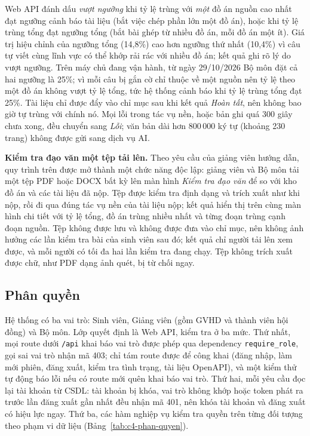 \documentclass[../main.tex]{subfiles}
\begin{document}
Web API đánh dấu \textit{vượt ngưỡng} khi tỷ lệ trùng với \textit{một} đồ án nguồn cao nhất đạt ngưỡng cảnh báo tài liệu (bắt việc chép phần lớn một đồ án), hoặc khi tỷ lệ trùng tổng đạt ngưỡng tổng (bắt bài ghép từ nhiều đồ án, mỗi đồ án một ít). Giá trị hiệu chỉnh của ngưỡng tổng (14,8\%) cao hơn ngưỡng thứ nhất (10,4\%) vì câu tự viết cùng lĩnh vực có thể khớp rải rác với nhiều đồ án; kết quả ghi rõ lý do vượt ngưỡng. Trên máy chủ đang vận hành, từ ngày 29/10/2026 Bộ môn đặt cả hai ngưỡng là 25\%; vì mỗi câu bị gắn cờ chỉ thuộc về một nguồn nên tỷ lệ theo một đồ án không vượt tỷ lệ tổng, tức hệ thống cảnh báo khi tỷ lệ trùng tổng đạt 25\%. Tài liệu chỉ được đẩy vào chỉ mục sau khi kết quả \textit{Hoàn tất}, nên không bao giờ tự trùng với chính nó. Mọi lỗi trong tác vụ nền, hoặc bản ghi quá 300 giây chưa xong, đều chuyển sang \textit{Lỗi}; văn bản dài hơn 800\,000 ký tự (khoảng 230 trang) không được gửi sang dịch vụ AI.

\textbf{Kiểm tra đạo văn một tệp tải lên.} Theo yêu cầu của giảng viên hướng dẫn, quy trình trên được mở thành một chức năng độc lập: giảng viên và Bộ môn tải một tệp PDF hoặc DOCX bất kỳ lên màn hình \textit{Kiểm tra đạo văn} để so với kho đồ án và các tài liệu đã nộp. Tệp được kiểm tra định dạng và trích xuất như khi nộp, rồi đi qua đúng tác vụ nền của tài liệu nộp; kết quả hiển thị trên cùng màn hình chi tiết với tỷ lệ tổng, đồ án trùng nhiều nhất và từng đoạn trùng cạnh đoạn nguồn. Tệp không được lưu và không được đưa vào chỉ mục, nên không ảnh hưởng các lần kiểm tra bài của sinh viên sau đó; kết quả chỉ người tải lên xem được, và mỗi người có tối đa hai lần kiểm tra đang chạy. Tệp không trích xuất được chữ, như PDF dạng ảnh quét, bị từ chối ngay.

\subsection{Phân quyền}

Hệ thống có ba vai trò: Sinh viên, Giảng viên (gồm GVHD và thành viên hội đồng) và Bộ môn. Lớp quyết định là Web API, kiểm tra ở ba mức. Thứ nhất, mọi route dưới \texttt{/api} khai báo vai trò được phép qua dependency \texttt{require\_role}, gọi sai vai trò nhận mã 403; chỉ tám route được để công khai (đăng nhập, làm mới phiên, đăng xuất, kiểm tra tình trạng, tài liệu OpenAPI), và một kiểm thử tự động báo lỗi nếu có route mới quên khai báo vai trò. Thứ hai, mỗi yêu cầu đọc lại tài khoản từ CSDL: tài khoản bị khóa, vai trò không khớp hoặc token phát ra trước lần đăng xuất gần nhất đều nhận mã 401, nên khóa tài khoản và đăng xuất có hiệu lực ngay. Thứ ba, các hàm nghiệp vụ kiểm tra quyền trên từng đối tượng theo phạm vi dữ liệu (Bảng~\ref{tab:c4-phan-quyen}).
\end{document}
